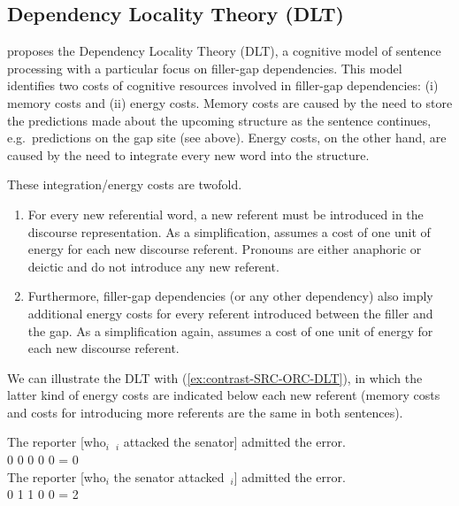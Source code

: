 \subsection{Dependency Locality Theory (DLT)}

\citet{Gibson.1998,Gibson.2000} proposes the Dependency Locality Theory (DLT), a cognitive model of sentence processing with a particular focus on filler-gap dependencies. This model identifies two costs of cognitive resources involved in filler-gap dependencies: (i) memory costs and (ii) energy costs. Memory costs are caused by the need to store the predictions made about the upcoming structure as the sentence continues, e.g.\ predictions on the gap site (see above). Energy costs, on the other hand, are caused by the need to integrate every new word into the structure. 

These integration/energy costs are twofold. 
\begin{enumerate}
    \item For every new referential word, a new referent must be introduced in the discourse representation. As a simplification, \citeauthor{Gibson.2000} assumes a cost of one unit of energy for each new discourse referent. Pronouns are either anaphoric or deictic and do not introduce any new referent. 
    \item Furthermore, filler-gap dependencies (or any other dependency) also imply additional energy costs for every referent introduced between the filler and the gap. As a simplification again, \citeauthor{Gibson.1998} assumes a cost of one unit of energy for each new discourse referent. 
\end{enumerate}

We can illustrate the DLT with (\ref{ex:contrast-SRC-ORC-DLT}), in which the latter kind of energy costs are indicated below each new referent (memory costs and costs for introducing more referents are the same in both sentences).

\eal \label{ex:contrast-SRC-ORC-DLT}
\ex \gll The reporter [who$_i$~\trace{}$_i$ attacked the senator] admitted the error.\\
{} 0 {} 0 {} 0 0 {} 0 = 0\\  \label{ex:contrast-SRC-DLT}
\ex \gll The reporter [who$_i$ the senator attacked~\trace{}$_i$] admitted the error.\\
{} 0 {} {} 1 1 0 {} 0 = 2\\ \label{ex:contrast-ORC-DLT}
\zl 

